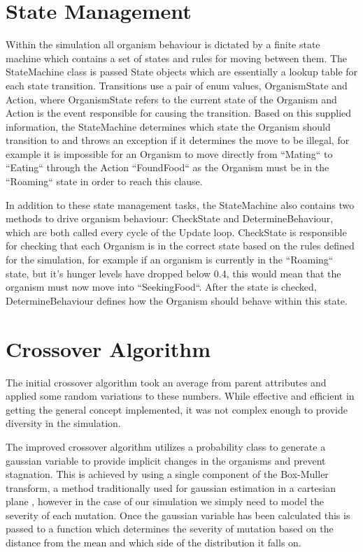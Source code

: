 \documentclass[a4paper, oneside, 11pt]{report}
\begin{document}
\section{State Management}\label{statemanagement}
Within the simulation all organism behaviour is dictated by a finite state machine which contains a set of states and rules for moving between them. The StateMachine class is passed State objects which are essentially a lookup table for each state transition. Transitions use a pair of enum values, OrganismState and Action, where OrganismState refers to the current state of the Organism and Action is the event responsible for causing the transition. Based on this supplied information, the StateMachine determines which state the Organism should transition to and throws an exception if it determines the move to be illegal, for example it is impossible for an Organism to move directly from ``Mating`` to ``Eating`` through the Action ``FoundFood`` as the Organism must be in the ``Roaming`` state in order to reach this clause.

In addition to these state management tasks, the StateMachine also contains two methods to drive organism behaviour: CheckState and DetermineBehaviour, which are both called every cycle of the Update loop. CheckState is responsible for checking that each Organism is in the correct state based on the rules defined for the simulation, for example if an organism is currently in the ``Roaming`` state, but it's hunger levels have dropped below 0.4, this would mean that the organism must now move into ``SeekingFood``. After the state is checked, DetermineBehaviour defines how the Organism should behave within this state.

\section{Crossover Algorithm}\label{crossover}
The initial crossover algorithm took an average from parent attributes and applied some random variations to these numbers. While effective and efficient in getting the general concept implemented, it was not complex enough to provide diversity in the simulation.

The improved crossover algorithm utilizes a probability class to generate a gaussian variable to provide implicit changes in the organisms and prevent stagnation. This is achieved by using a single component of the Box-Muller transform, a method traditionally used for gaussian estimation in a cartesian plane \cite{box1958note}, however in the case of our simulation we simply need to model the severity of each mutation. Once the gaussian variable has been calculated this is passed to a function which determines the severity of mutation based on the distance from the mean and which side of the distribution it falls on.
\end{document}
